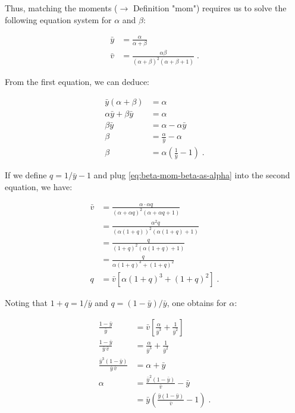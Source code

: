 \documentclass[a4paper,12pt,twoside]{book}
\begin{document}
Thus, matching the moments ($\rightarrow$ Definition "mom") requires us to solve the following equation system for $\alpha$ and $\beta$:

\begin{equation} \label{eq:beta-mom-Beta-mean-var}
\begin{split}
\bar{y} &= \frac{\alpha}{\alpha+\beta} \\
\bar{v} &= \frac{\alpha\beta}{(\alpha+\beta)^2 (\alpha+\beta+1)} \; .
\end{split}
\end{equation}

From the first equation, we can deduce:

\begin{equation} \label{eq:beta-mom-beta-as-alpha}
\begin{split}
\bar{y}(\alpha+\beta) &= \alpha \\
\alpha \bar{y} + \beta \bar{y} &= \alpha \\
\beta \bar{y} &= \alpha - \alpha \bar{y} \\
\beta &= \frac{\alpha}{\bar{y}} - \alpha \\
\beta &= \alpha \left( \frac{1}{\bar{y}} - 1 \right) \; .
\end{split}
\end{equation}

If we define $q = 1/\bar{y} - 1$ and plug \eqref{eq:beta-mom-beta-as-alpha} into the second equation, we have:

\begin{equation} \label{eq:beta-mom-alpha-as-q}
\begin{split}
\bar{v} &= \frac{\alpha \cdot \alpha q}{(\alpha + \alpha q)^2 (\alpha + \alpha q + 1)} \\
&= \frac{\alpha^2 q}{(\alpha (1+q))^2 (\alpha (1+q) + 1)} \\
&= \frac{q}{(1+q)^2 (\alpha (1+q) + 1)} \\
&= \frac{q}{\alpha (1+q)^3 + (1+q)^2} \\
q &= \bar{v} \left[ \alpha (1+q)^3 + (1+q)^2 \right] \; .
\end{split}
\end{equation}

Noting that $1+q = 1/\bar{y}$ and $q = (1-\bar{y})/\bar{y}$, one obtains for $\alpha$:

\begin{equation} \label{eq:beta-mom-Beta-MoM-alpha}
\begin{split}
\frac{1-\bar{y}}{\bar{y}} &= \bar{v} \left[ \frac{\alpha}{\bar{y}^3} + \frac{1}{\bar{y}^2} \right] \\
\frac{1-\bar{y}}{\bar{y} \, \bar{v}} &= \frac{\alpha}{\bar{y}^3} + \frac{1}{\bar{y}^2} \\
\frac{\bar{y}^3(1-\bar{y})}{\bar{y} \, \bar{v}} &= \alpha + \bar{y} \\
\alpha &= \frac{\bar{y}^2(1-\bar{y})}{\bar{v}} - \bar{y} \\
&= \bar{y} \left( \frac{\bar{y} (1-\bar{y})}{\bar{v}} - 1 \right) \; .
\end{split}
\end{equation}
\end{document}
